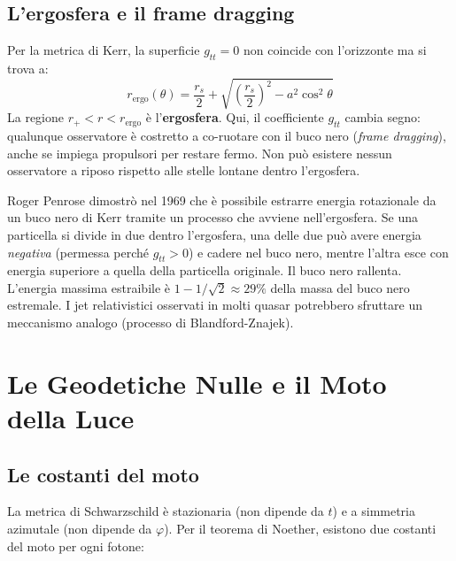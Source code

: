\documentclass[12pt, a4paper, twoside]{article}
\newenvironment{curiosity}[1]{%
  \begin{tcolorbox}[curiositybox, title={Curiosit\`a: #1}]
}{%
  \end{tcolorbox}
}
\theoremstyle{definition}
\newcommand{\RS}{r_{\!s}}          %
\begin{document}
\subsection{L'ergosfera e il frame dragging}

Per la metrica di Kerr, la superficie $g_{tt} = 0$ non coincide con l'orizzonte
ma si trova a:
\begin{equation}
  r_{\text{ergo}}(\theta) = \frac{\RS}{2} + \sqrt{\left(\frac{\RS}{2}\right)^2 - a^2\cos^2\theta}
\end{equation}
La regione $r_+ < r < r_{\text{ergo}}$ è l'\textbf{ergosfera}. Qui, il
coefficiente $g_{tt}$ cambia segno: qualunque osservatore è costretto a
co-ruotare con il buco nero (\emph{frame dragging}), anche se impiega propulsori
per restare fermo. Non può esistere nessun osservatore a riposo rispetto alle
stelle lontane dentro l'ergosfera.

\begin{curiosity}{Il Processo di Penrose}
  Roger Penrose dimostrò nel 1969 che è possibile estrarre energia rotazionale
  da un buco nero di Kerr tramite un processo che avviene nell'ergosfera.
  Se una particella si divide in due dentro l'ergosfera, una delle due può
  avere energia \emph{negativa} (permessa perché $g_{tt} > 0$) e cadere
  nel buco nero, mentre l'altra esce con energia superiore a quella della
  particella originale. Il buco nero rallenta. L'energia massima estraibile
  è $1 - 1/\sqrt{2} \approx 29\%$ della massa del buco nero estremale.
  I jet relativistici osservati in molti quasar potrebbero sfruttare un
  meccanismo analogo (processo di Blandford-Znajek).
\end{curiosity}

\newpage

\section{Le Geodetiche Nulle e il Moto della Luce}

\subsection{Le costanti del moto}

La metrica di Schwarzschild è stazionaria (non dipende da $t$) e a simmetria
azimutale (non dipende da $\varphi$). Per il teorema di Noether, esistono due
costanti del moto per ogni fotone:
\end{document}
